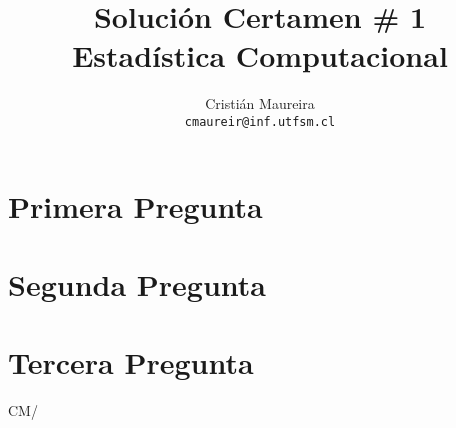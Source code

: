 \documentclass[spanish]{article}
\author{
Cristián Maureira  \\
\texttt{cmaureir@inf.utfsm.cl}
}
\title{Solución Certamen \# 1\\
       Estadística Computacional
}
\begin{document}
\maketitle

\section{Primera Pregunta}
\label{sec:p1}


\section{Segunda Pregunta}
\label{sec:p2}


\section{Tercera Pregunta}
\label{sec:p3}



\vspace{\fill}
\hspace{\fill}CM/\LaTeXe
\end{document}
